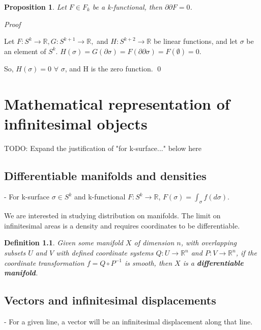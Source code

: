 \documentclass{book}
\newtheorem{defn}[equation]{Definition}
\newtheorem{prop}[equation]{Proposition}
\renewenvironment{proof}{\emph{Proof}}{\qed}
\begin{document}
\begin{prop}
	Let $F \in F_k$ be a k-functional, then $\partial\partial F = 0 $.
\end{prop}
\begin{proof}

	Let $F : S^k \to \mathbb{R}, G : S^{k+1} \to \mathbb{R},$ and $H : S^{k+2} \to \mathbb{R}$ be linear functions, and let $\sigma$ be an element of $S^k$. $H(\sigma) = G(\partial\sigma) = F(\partial\partial\sigma) = F(\emptyset) = 0$. 
	
	So, $H(\sigma) = 0$ $\forall$ $\sigma$, and H is the zero function. 
\end{proof}






\chapter{Mathematical representation of infinitesimal objects}

TODO: Expand the justification of "for k-surface..." below here

\section{Differentiable manifolds and densities}


- For k-surface $\sigma \in S^k$ and k-functional $F: S^k \to \mathbb{R}$, $F(\sigma) = \int_{\sigma}f(d\sigma)$. 

We are interested in studying distribution on manifolds. The limit on infinitesimal areas is a density and requires coordinates to be differentiable.


\begin{defn}
	Given some manifold $X$ of dimension $n$, with overlapping subsets $U$ and $V$ with defined coordinate systems $Q: U \to \mathbb{R}^n$ and $P: V \to \mathbb{R}^n$, if the coordinate transformation $f = Q \circ P^{-1}$ is smooth, then $X$ is a \textbf{differentiable manifold}. 
\end{defn}





\section{Vectors and infinitesimal displacements}

- For a given line, a vector will be an infinitesimal displacement along that line. 
\end{document}
